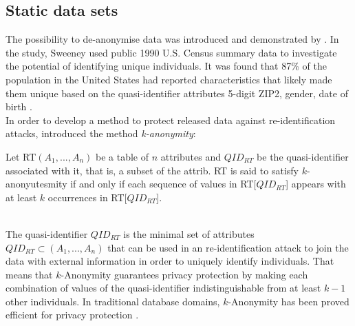 \subsection{Static data sets}

\noindent The possibility to de-anonymise data was introduced and demonstrated by . In the study, Sweeney used public 1990 U.S. Census summary data to investigate the potential of identifying unique individuals. It was found that 87\% of the population in the United States had reported characteristics that likely made them unique based on the quasi-identifier attributes 5-digit ZIP2, gender, date of birth \cite{sweeney2000}. 
\\
In order to develop a method to protect released data against re-identification attacks,  introduced the method \textit{k-anonymity}:

\begin{definition}[$k$-Anonymity]
Let RT$(A_1,...,A_n)$ be a table of $n$ attributes and $QID_{RT}$ be the quasi-identifier associated with it, that is, a subset of the attrib. RT is said to satisfy $k$-anonyutesmity if and only if each sequence of values in RT[$QID_{RT}$] appears with at least $k$ occurrences in RT[$QID_{RT}$]. \cite{kanonymity2002}
\end{definition}
\\
\noindent The quasi-identifier $QID_{RT}$ is the minimal set of attributes $QID_{RT} \subset (A_1,...,A_n)$ that can be used in an re-identification attack to join the data with external information in order to uniquely identify individuals. That means that $k$-Anonymity guarantees privacy protection by making each combination of values of the quasi-identifier indistinguishable from at least $k-1$ other individuals. In traditional database domains, $k$-Anonymity has been proved efficient for privacy protection \cite{li2008}.\\

